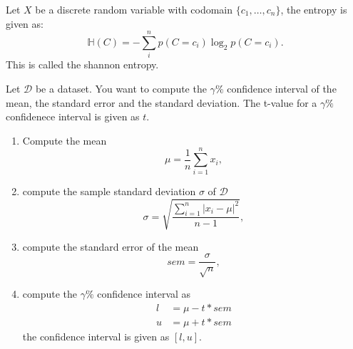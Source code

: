 \begin{exmp}
    Let $ X $ be a discrete random variable with codomain $ \{ c_1 , \dotsc , c_n \} $, the entropy is given as:
    \[
        \mathbb{ H } ( C ) 
        =
        - \sum_{i}^n p ( C = c_i ) \log_2 p ( C = c_i ). 
    \]
    This is called the shannon entropy.
\end{exmp}

\begin{recipe}
    Let $ \mathcal{ D } $ be a dataset. You want to compute the $ \gamma \% $ confidence interval of the mean, the standard error and the standard deviation.
    The t-value for a $ \gamma \% $ confidenece interval is given as $ t $.

    \begin{enumerate}
        \item 
        Compute the mean 
        \[
            \mu 
            =
            \frac{ 1 }{ n }
            \sum_{ i = 1 }^n x_i,
        \]

        \item 
        compute the sample standard deviation $ \sigma $ of $ \mathcal{ D } $
        \[
            \sigma
            =
            \sqrt{ \frac{ \sum_{ i = 1 }^n \lvert x_i - \mu \rvert^2 }{ n - 1 } },
        \]

        \item 
        compute the standard error of the mean
        \[
            sem 
            =
            \frac{ \sigma }{ \sqrt{ n } },
        \]

        \item 
        compute the $ \gamma \% $ confidence interval as 
        \begin{align*}
            l 
            &=
            \mu - t * sem
            \\
            u 
            &=
            \mu + t * sem
        \end{align*}
        the confidence interval is given as $ [ l , u ] $.
    \end{enumerate}
\end{recipe}
